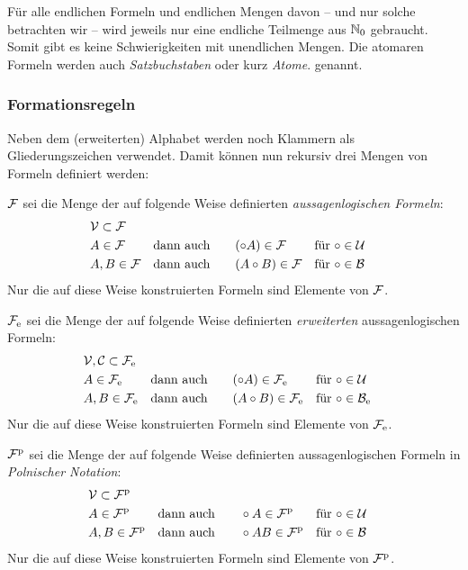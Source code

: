 \documentclass[english,ngerman,parskip=half,headsepline,footsepline]{scrreprt}
\newcommand*{\Idx}[1]{#1\idx{#1}}%
\begin{document}
	Für alle endlichen Formeln und endlichen Mengen davon -- und nur solche betrachten wir -- wird jeweils nur eine endliche Teilmenge aus $\mathbb{N}_0$ gebraucht.
	Somit gibt es keine Schwierigkeiten mit unendlichen Mengen.
	Die atomaren Formeln werden auch \emph{\Idx{Satzbuchstabe}}\emph{n} oder kurz \emph{\Idx{Atom}}\emph{e}. genannt.

	\subsubsection{Formationsregeln}
	\label{subsub:Formeln}

	Neben dem (erweiterten) Alphabet werden noch Klammern als Gliederungszeichen verwendet.
	Damit können nun rekursiv drei Mengen von Formeln definiert werden:

	$\mathcal{F}$ sei die Menge der auf folgende Weise definierten \emph{aussagenlogischen Formeln}:
	\begin{align}
		&\mathcal{V}\subset\mathcal{F}\\
		&A\in\mathcal{F}&&\textrm{dann auch}\quad\quad(\circ A)\in\mathcal{F}&&\textrm{für}~\circ\in\mathcal{U}\\
		&A,B\in\mathcal{F}&&\textrm{dann auch}\quad\quad(A\circ B)\in\mathcal{F}&&\textrm{für}~\circ\in\mathcal{B}
	\end{align}
	Nur die auf diese Weise konstruierten Formeln sind Elemente von $\mathcal{F}$.

	$\mathcal{F}_\mathrm{e}$ sei die Menge der auf folgende Weise definierten \emph{erweiterten} aussagenlogischen Formeln:
	\begin{align}
		&\mathcal{V}, \mathcal{C}\subset\mathcal{F}_\mathrm{e}\\
		&A\in\mathcal{F}_\mathrm{e}&&\textrm{dann auch}\quad\quad(\circ A)\in\mathcal{F}_\mathrm{e}&&\textrm{für}~\circ\in\mathcal{U}\\
		&A,B\in\mathcal{F}_\mathrm{e}&&\textrm{dann auch}\quad\quad(A\circ B)\in\mathcal{F}_\mathrm{e}&&\textrm{für}~\circ\in\mathcal{B}_\mathrm{e}
	\end{align}
	Nur die auf diese Weise konstruierten Formeln sind Elemente von $\mathcal{F}_\mathrm{e}$.

	$\mathcal{F}^\mathrm{p}$ sei die Menge der auf folgende Weise definierten aussagenlogischen Formeln in \emph{Polnischer Notation}:
	\begin{align}
		&\mathcal{V}\subset\mathcal{F}^\mathrm{p}\\
		&A\in\mathcal{F}^\mathrm{p}&&\textrm{dann auch}\quad\quad\circ A\in\mathcal{F}^\mathrm{p}&&\textrm{für}~\circ\in\mathcal{U}\\
		&A,B\in\mathcal{F}^\mathrm{p}&&\textrm{dann auch}\quad\quad\circ A B\in\mathcal{F}^\mathrm{p}&&\textrm{für}~\circ\in\mathcal{B}
	\end{align}
	Nur die auf diese Weise konstruierten Formeln sind Elemente von $\mathcal{F}^\mathrm{p}$.
\end{document}
